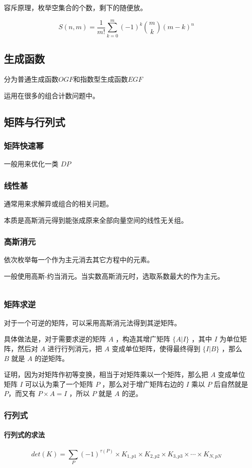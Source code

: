 \documentclass[UTF-8]{ctexart}
\newcommand{\cpp}[1]{\inputminted[bgcolor=bg,breaklines,breakanywhere=true]{c++}{#1}}
\begin{document}
			容斥原理，枚举空集合的个数，剩下的随便放。
			
			$$S(n,m)={\frac 1 {m!}}\sum_{k=0}^m (-1)^k {m \choose k}(m-k)^n$$
		\subsection{生成函数}
		分为普通生成函数$OGF$和指数型生成函数$EGF$
		
		运用在很多的组合计数问题中。
		\subsection{矩阵与行列式}
			\subsubsection{矩阵快速幂}
			一般用来优化一类 $DP$
			\subsubsection{线性基}
			通常用来求解异或组合的相关问题。
			
			本质是高斯消元得到能张成原来全部向量空间的线性无关组。
			\subsubsection{高斯消元}
			依次枚举每一个作为主元消去其它方程中的元素。
			
			一般使用高斯-约当消元。当实数高斯消元时，选取系数最大的作为主元。
			
			\cpp{code//Math//gauss.cpp}
			\subsubsection{矩阵求逆}
			对于一个可逆的矩阵，可以采用高斯消元法得到其逆矩阵。
			
			具体做法是，对于需要求逆的矩阵 $A$ ，构造其增广矩阵 $\{A|I\}$ ，其中 $I$ 为单位矩阵，然后对 $A$ 进行行列消元，把 $A$ 变成单位矩阵，使得最终得到 $\{I|B\}$ ，那么 $B$ 就是 $A$ 的逆矩阵。
			
			证明，因为对矩阵作初等变换，相当于对矩阵乘以一个矩阵，那么把 $A$ 变成单位矩阵 $I$ 可以认为乘了一个矩阵 $P$ ，那么对于增广矩阵右边的 $I$ 乘以 $P$ 后自然就是 $P$，而又有 $P\times A=I$ ，所以 $P$ 就是 $A$ 的逆。
			\subsubsection{行列式}
			\paragraph{行列式的求法}
			$$det(K)=\sum _ {P}{(-1)}^{\tau{(P)}}\times{K} _ {1,p1}\times{K} _  {2,p2}\times{K}  _ {3,p3}\times\cdots\times{K} _ {N,pN}$$
			
\end{document}
